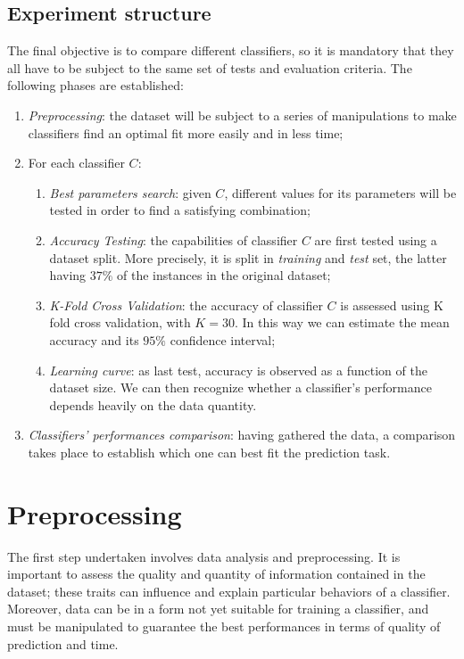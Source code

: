 \documentclass[a4paper, 10pt]{article}
\begin{document}
\subsection{Experiment structure}
The final objective is to compare different classifiers, so it is mandatory that they all have to be subject to the same set of tests and evaluation criteria. The following phases are established:
\begin{enumerate}
 \item \emph{Preprocessing}: the dataset will be subject to a series of manipulations to make classifiers find an optimal fit more easily and in less time;
 \item For each classifier $C$:
 \begin{enumerate}
  
    \item \emph{Best parameters search}: given $C$, different values for its parameters will be tested in order to find a satisfying combination;
    \item \emph{Accuracy Testing}: the capabilities of classifier $C$ are first tested using a dataset split. More precisely, it is split in \emph{training} and \emph{test} set, the latter having $37\%$ of the instances in the original dataset;
    \item \emph{K-Fold Cross Validation}: the accuracy of classifier $C$ is assessed using K fold cross validation, with $K = 30$. In this way we can estimate the mean accuracy and its $95\%$ confidence interval;
    \item \emph{Learning curve}: as last test, accuracy is observed as a function of the dataset size. We can then recognize whether a classifier's performance depends heavily on the data quantity.
  \end{enumerate}
 \item \emph{Classifiers' performances comparison}: having gathered the data, a comparison takes place to establish which one can best fit the prediction task.
\end{enumerate}


\section{Preprocessing}
The first step undertaken involves data analysis and preprocessing. It is important to assess the quality and quantity of information contained in the dataset; these traits can influence and explain particular behaviors of a classifier. Moreover, data can be in a form not yet suitable for training a classifier, and must be manipulated to guarantee the best performances in terms of quality of prediction and time.
\end{document}
